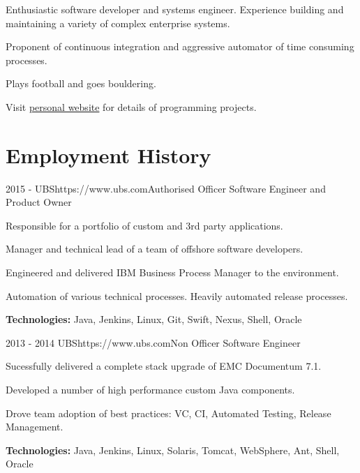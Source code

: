 \documentclass[10pt]{article}
\begin{document}
{\begin{itemize-noindent}
\setlength\itemsep{-0.2em}
\item Enthusiastic software developer and systems engineer. Experience building and maintaining a variety of complex enterprise systems.
\item Proponent of continuous integration and aggressive automator of time consuming processes.
\item Plays football and goes bouldering. 
\item Visit \href{http://www.mglewis.co.uk}{personal website} for details of programming projects.
\end{itemize-noindent}


\section{Employment History}

\job
{2015 -}
{UBS}{https://www.ubs.com}{Authorised Officer}
{Software Engineer and Product Owner}
{\begin{itemize-noindent}
\setlength\itemsep{-0.2em}
\item Responsible for a portfolio of custom and 3rd party applications.
\item Manager and technical lead of a team of offshore software developers.
\item Engineered and delivered IBM Business Process Manager to the environment.
\item Automation of various technical processes. Heavily automated release processes.
\end{itemize-noindent}
\textbf{Technologies:} Java, Jenkins, Linux, Git, Swift, Nexus, Shell, Oracle}

\job
{2013 - 2014}
{UBS}{https://www.ubs.com}{Non Officer}
{Software Engineer}
{\begin{itemize-noindent}
\setlength\itemsep{-0.2em}
\item Sucessfully delivered a complete stack upgrade of EMC Documentum 7.1.
\item Developed a number of high performance custom Java components.
\item Drove team adoption of best practices: VC, CI, Automated Testing, Release Management.
\end{itemize-noindent}
\textbf{Technologies:} Java, Jenkins, Linux, Solaris, Tomcat, WebSphere, Ant, Shell, Oracle}

}
\end{document}
